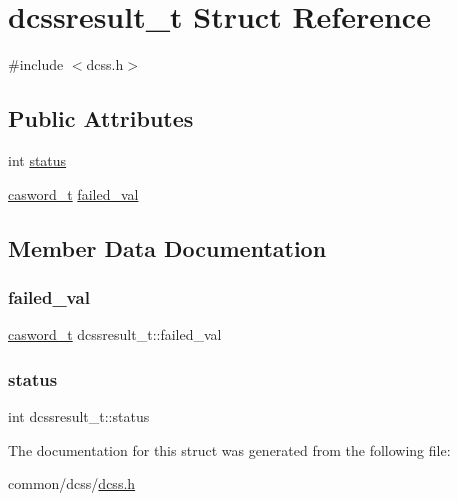 \hypertarget{structdcssresult__t}{}\section{dcssresult\+\_\+t Struct Reference}
\label{structdcssresult__t}


{\ttfamily \#include $<$dcss.\+h$>$}

\subsection*{Public Attributes}
\begin{DoxyCompactItemize}
\item 
int \hyperlink{structdcssresult__t_a7f0bd31c2ae6c0a2ca6f8148ca9f36e3}{status}
\item 
\hyperlink{rq__unsafe_8h_ad45142aaf2ff20a036dc6242b8483e9c}{casword\+\_\+t} \hyperlink{structdcssresult__t_a9b232231fd2072c6fe9655796b2e34df}{failed\+\_\+val}
\end{DoxyCompactItemize}


\subsection{Member Data Documentation}
\mbox{\label{structdcssresult__t_a9b232231fd2072c6fe9655796b2e34df}} 
\subsubsection{\texorpdfstring{failed\+\_\+val}{failed\_val}}
{\footnotesize\ttfamily \hyperlink{rq__unsafe_8h_ad45142aaf2ff20a036dc6242b8483e9c}{casword\+\_\+t} dcssresult\+\_\+t\+::failed\+\_\+val}

\mbox{\label{structdcssresult__t_a7f0bd31c2ae6c0a2ca6f8148ca9f36e3}} 
\subsubsection{\texorpdfstring{status}{status}}
{\footnotesize\ttfamily int dcssresult\+\_\+t\+::status}



The documentation for this struct was generated from the following file\+:\begin{DoxyCompactItemize}
\item 
common/dcss/\hyperlink{dcss_8h}{dcss.\+h}\end{DoxyCompactItemize}
